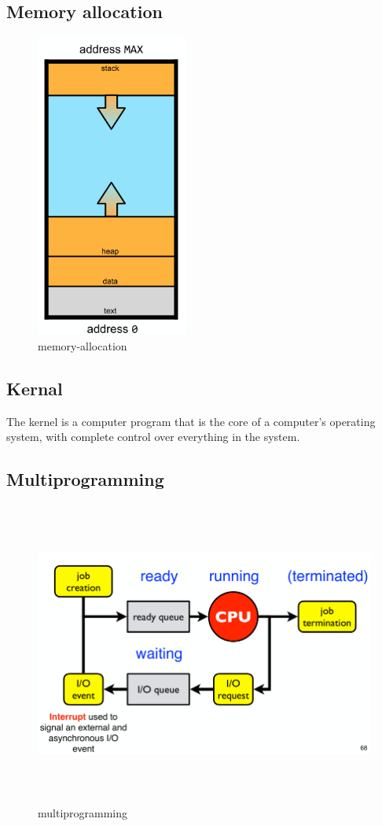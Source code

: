 \subsection{Memory allocation}
\begin{figure}[h]
    \vspace{10mm}
    \centering
    \includegraphics[width=5cm, height=10cm]{image/memory-allocation.png}
    \caption{memory-allocation}
\end{figure}

\subsection{Kernal}
The kernel is a computer program
that is the core of a computer’s
operating system, with complete
control over everything in the
system.

\subsection{Multiprogramming}
\begin{figure}[h]
    \vspace{10mm}
    \centering
    \includegraphics[width=14cm, height=10cm]{image/multiprogramming.png}
    \caption{multiprogramming}
\end{figure}

